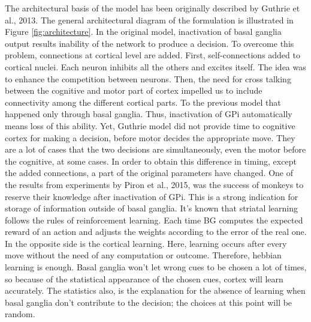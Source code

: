 	The architectural basis of the model has been originally described by Guthrie et al., 2013. The general architectural diagram of the formulation is illustrated in Figure \ref{fig:architecture}. In the original model, inactivation of basal ganglia output results inability of the network to produce a decision. To overcome this problem, connections at cortical level are added. 
	First, self-connections added to cortical nuclei. Each neuron inhibits all the others and excites itself. The idea was to enhance the competition between neurons.
	Then, the need for cross talking between the cognitive and motor part of cortex impelled us to include connectivity among the different cortical parts. To the previous model that happened only through basal ganglia. Thus, inactivation of GPi automatically means loss of this ability. 
	Yet,  Guthrie model did not provide time to cognitive cortex for making a decision, before motor  decides the appropriate move. They are a lot of cases that the two decisions are simultaneously, even the motor before the cognitive, at some cases. In order to obtain this difference in timing, except the added connections, a part of the original parameters have changed. 
	One of the results from experiments by Piron et al., 2015, was the success of monkeys to reserve their knowledge after inactivation of GPi. This is a strong indication for storage of information outside of basal ganglia. It's known that striatal learning follows the rules of reinforcement learning. Each time BG computes the expected reward of an action and adjusts the weights according to the error of the real one. In the opposite side is the cortical learning. Here, learning occurs after every move without the need of any computation or outcome. Therefore, hebbian learning is enough. Basal ganglia won't let wrong cues to be chosen a lot of times, so because of the statistical appearance of the chosen cues, cortex will learn accurately.  The statistics also, is the explanation for the absence of learning when basal ganglia don't contribute to the decision; the choices at this point will be random.